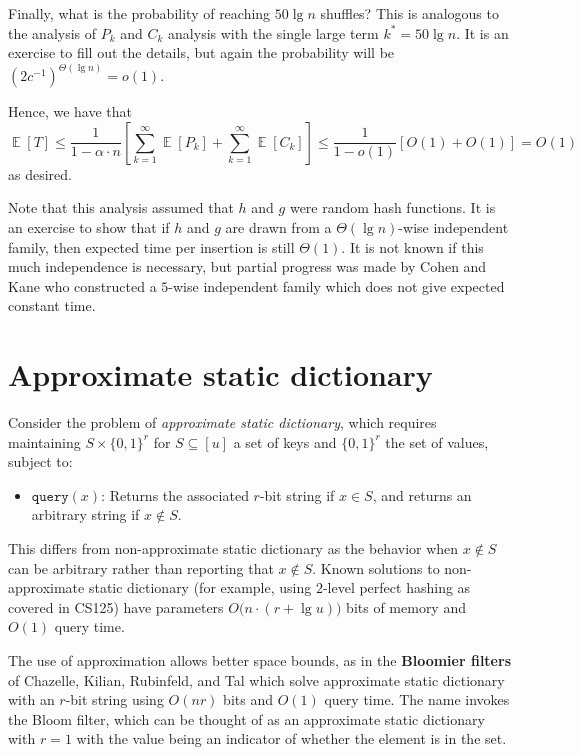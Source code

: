 \documentclass[11pt]{article}
\DeclareMathOperator*{\E}{\mathbb{E}}
\begin{document}
Finally, what is the probability of reaching $50\lg n$ shuffles? This is
analogous to the analysis of $P_k$ and $C_k$ analysis with the single large term
$k^* = 50\lg n$. It is an exercise to fill out the details, but again the
probability will be $(2c^{-1})^{\Theta(\lg n)} = o(1)$.

Hence, we have that
\[\E[T] \leq \frac{1}{1 - \alpha\cdot n} \left[\sum_{k=1}^\infty
\E[P_k] + \sum_{k=1}^{\infty} \E[C_k]\right]
\leq \frac{1}{1 - o(1)}[O(1) + O(1)]  = O(1)
\]
as desired.

Note that this analysis assumed that $h$ and $g$ were random hash functions. It
is an exercise to show that if $h$ and $g$ are drawn from a $\Theta(\lg n)$-wise
independent family, then expected time per insertion is still $\Theta(1)$. It is
not known if this much independence is necessary, but partial progress was made
by Cohen and Kane \cite{Cohen2009} who constructed a $5$-wise independent
family which does not give expected constant time.

\section{Approximate static dictionary}
Consider the problem of \emph{approximate static dictionary}, which requires
maintaining $S\times \{0,1\}^r$ for $S \subseteq [u]$ a set of keys and
$\{0,1\}^r$ the set of values, subject to:
\begin{itemize}
\item $\mathtt{query}(x)$: Returns the associated $r$-bit string if $x\in
S$, and returns an arbitrary string if $x\not\in S$.
\end{itemize}

This differs from non-approximate static dictionary as the behavior when
$x\not\in S$ can be arbitrary rather than reporting that $x\not\in S$. Known
solutions to non-approximate static dictionary (for example, using $2$-level
perfect hashing as covered in CS125) have parameters $O\big(n\cdot (r + \lg
u)\big)$ bits of memory and $O(1)$ query time.

The use of approximation allows better space bounds, as in the \textbf{Bloomier
filters} of Chazelle, Kilian, Rubinfeld, and Tal \cite{Chazelle2004} which solve
approximate static dictionary with an $r$-bit string using $O(nr)$ bits and
$O(1)$ query time. The name invokes the Bloom filter, which can be thought of as
an approximate static dictionary with $r = 1$ with the value being an indicator
of whether the element is in the set.
\end{document}
